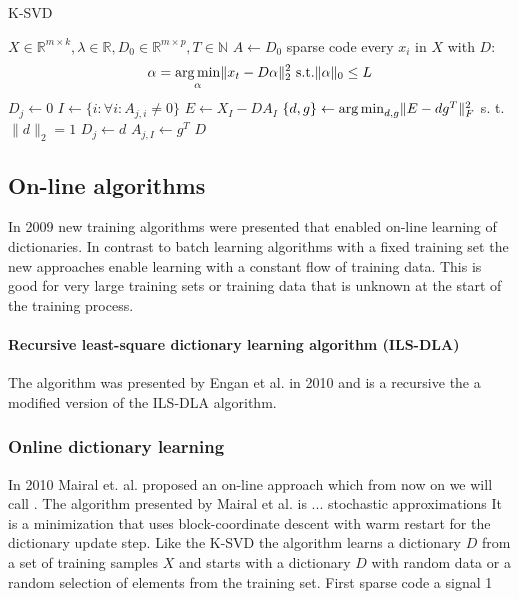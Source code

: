 \begin{algorithm}[H]
\caption{K-SVD}
\label{alg:k-svd}
\begin{algorithmic}[1]
\REQUIRE $X \in \mathbb{R}^{m \times k}, \lambda \in
\mathbb{R}, D_0 \in \mathbb{R}^{m \times p}, T \in \mathbb{N}$
\STATE $A \gets D_0$
\STATE sparse code every $x_i$ in $X$ with $D$:
\begin{equation}
\alpha = \operatorname*{arg\,min}_{\alpha}\lVert
x_t - D\alpha\rVert_2^2 \text{ s.t.} \lVert\alpha\rVert_0 \leq L
\end{equation}
\label{alg:k-svd_start}
\STATE $D_j \gets 0$
\STATE $I \gets \{ i : \forall i : A_{j,i} \neq 0 \}$
\STATE $E \gets X_I - DA_I$
\STATE $\{ d,g\} \gets \operatorname*{arg\,min}_{d,g} \lVert E- dg^T \rVert_F^{2}$ s. t. $\lVert
d
\rVert_{2} = 1$
\STATE $D_j \gets d$
\STATE $A_{j,I} \gets g^T$
\ENDFOR\label{alg:k-svd_end}
\ENDFOR
\RETURN $D$
\end{algorithmic}
\end{algorithm}

\subsection{On-line algorithms}
In 2009 new training algorithms were presented that enabled on-line learning of
dictionaries. In contrast to batch learning algorithms with a fixed training set
the new approaches enable learning with a constant flow of training data. This
is good for very large training sets or training data that is unknown at the
start of the training process.

\paragraph{Recursive least-square dictionary learning algorithm (ILS-DLA)}
The algorithm was presented by Engan et al. in 2010\cite{Engan2010} and is a
recursive the a modified version of the ILS-DLA algorithm.


\subsubsection{Online dictionary learning}
\label{sec:mairal}
In 2010 Mairal et. al.\cite{Mairal2010} proposed an on-line approach which from
now on we will call \trainDL. The algorithm presented by Mairal et
al.\cite{Mairal2010} is ... 
stochastic approximations 
It is a minimization that uses block-coordinate descent with warm restart for
the dictionary update step.
Like the K-SVD the algorithm learns a dictionary $D$ from a set of training
samples $X$ and starts with a dictionary $D$ with random data or a random
selection of elements from the training set. 
First sparse code a signal  1

